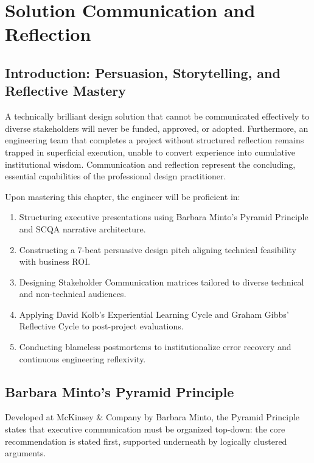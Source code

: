 \chapter{Solution Communication and Reflection}
\label{chap:communication-reflection}

\section{Introduction: Persuasion, Storytelling, and Reflective Mastery}
A technically brilliant design solution that cannot be communicated effectively to diverse stakeholders will never be funded, approved, or adopted. Furthermore, an engineering team that completes a project without structured reflection remains trapped in superficial execution, unable to convert experience into cumulative institutional wisdom. Communication and reflection represent the concluding, essential capabilities of the professional design practitioner.

\begin{important}
Upon mastering this chapter, the engineer will be proficient in:
\begin{enumerate}[leftmargin=1.5em]
    \item Structuring executive presentations using Barbara Minto's Pyramid Principle and SCQA narrative architecture.
    \item Constructing a 7-beat persuasive design pitch aligning technical feasibility with business ROI.
    \item Designing Stakeholder Communication matrices tailored to diverse technical and non-technical audiences.
    \item Applying David Kolb's Experiential Learning Cycle and Graham Gibbs' Reflective Cycle to post-project evaluations.
    \item Conducting blameless postmortems to institutionalize error recovery and continuous engineering reflexivity.
\end{enumerate}
\end{important}

\section{Barbara Minto's Pyramid Principle}
Developed at McKinsey \& Company by Barbara Minto, the Pyramid Principle states that executive communication must be organized top-down: the core recommendation is stated first, supported underneath by logically clustered arguments.

